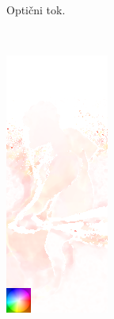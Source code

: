 \begin{figure}[!htb]
\begin{subfigure}[t]{0.3\columnwidth}
		\caption{Optični tok.}
		\label{fig:stage2-field-of}
	\end{subfigure}
	~
	\begin{subfigure}[t]{0.3\columnwidth}
		\centering
		\includegraphics[width=\columnwidth, frame]{./Slike/stage2-field-sf-svbv-flo-corrected.png}

\end{subfigure}
\end{figure}

